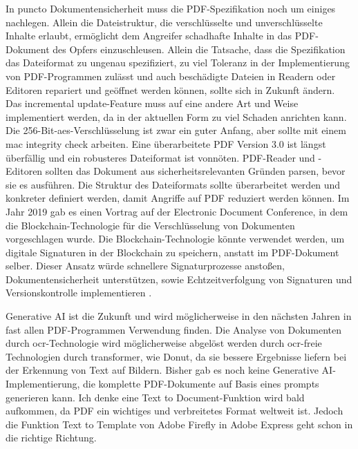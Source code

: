 In puncto Dokumentensicherheit muss die PDF-Spezifikation noch um einiges nachlegen. Allein die Dateistruktur, die verschlüsselte und unverschlüsselte Inhalte erlaubt, ermöglicht dem Angreifer schadhafte Inhalte in das PDF-Dokument des Opfers einzuschleusen. Allein die Tatsache, dass die Spezifikation das Dateiformat zu ungenau spezifiziert, zu viel Toleranz in der Implementierung von PDF-Programmen zulässt und auch beschädigte Dateien in Readern oder Editoren repariert und geöffnet werden können, sollte sich in Zukunft ändern. Das incremental update-Feature muss auf eine andere Art und Weise implementiert werden, da in der aktuellen Form zu viel Schaden anrichten kann. Die 256-Bit-\gls{aes}-Verschlüsselung ist zwar ein guter Anfang, aber sollte mit einem \gls{mac} integrity check arbeiten. Eine überarbeitete PDF Version 3.0 ist längst überfällig und ein robusteres Dateiformat ist vonnöten. PDF-Reader und -Editoren sollten das Dokument aus sicherheitsrelevanten Gründen parsen, bevor sie es ausführen. Die Struktur des Dateiformats sollte überarbeitet werden und konkreter definiert werden, damit Angriffe auf PDF reduziert werden können. Im Jahr 2019 gab es einen Vortrag auf der Electronic Document Conference, in dem die Blockchain-Technologie für die Verschlüsselung von Dokumenten vorgeschlagen wurde. Die Blockchain-Technologie könnte verwendet werden, um digitale Signaturen in der Blockchain zu speichern, anstatt im PDF-Dokument selber. Dieser Ansatz würde schnellere Signaturprozesse anstoßen, Dokumentensicherheit unterstützen, sowie Echtzeitverfolgung von Signaturen und Versionskontrolle implementieren \cite{pdf-association-blockchain}.
\par
Generative AI ist die Zukunft und wird möglicherweise in den nächsten Jahren in fast allen PDF-Programmen Verwendung finden. Die Analyse von Dokumenten durch \gls{ocr}-Technologie wird möglicherweise abgelöst werden durch \gls{ocr}-freie Technologien durch transformer, wie Donut, da sie bessere Ergebnisse liefern bei der Erkennung von Text auf Bildern. Bisher gab es noch keine Generative AI-Implementierung, die komplette PDF-Dokumente auf Basis eines prompts generieren kann. Ich denke eine Text to Document-Funktion wird bald aufkommen, da PDF ein wichtiges und verbreitetes Format weltweit ist. Jedoch die Funktion Text to Template von Adobe Firefly in Adobe Express geht schon in die richtige Richtung. 